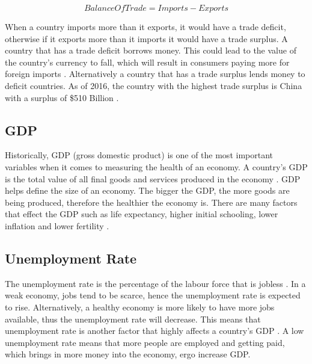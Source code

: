 \documentclass{UoYCSproject}
\begin{document}
\begin{equation}
    Balance Of Trade = Imports - Exports
\end{equation}

When a country imports more than it exports, it would have a trade deficit, otherwise if it exports more than it imports it would have a trade surplus. A country that has a trade deficit borrows money. This could lead to the value of the country's currency to fall, which will result in consumers paying more for foreign imports \cite{2003economics}. Alternatively a country that has a trade surplus lends money to deficit countries. As of 2016, the country with the highest trade surplus is China with a surplus of \$510 Billion \cite{tradesurplus}.   

\subsection{GDP}
Historically, GDP (gross domestic product) is one of the most important variables when it comes to measuring the health of an economy. A country's GDP is the total value of all final goods and services produced in the economy \cite{2003economics}. GDP helps define the size of an economy. The bigger the GDP, the more goods are being produced, therefore the healthier the economy is.  There are many factors that effect the GDP such as life expectancy, higher initial schooling, lower inflation and lower fertility \cite{barro1996determinants}. 

\subsection{Unemployment Rate}

The unemployment rate is the percentage of the labour force that is jobless \cite{unemployment}. In a weak economy, jobs tend to be scarce, hence the unemployment rate is expected to rise. Alternatively, a healthy economy is more likely to have more jobs available, thus the unemployment rate will decrease. This means that unemployment rate is another factor that highly affects a country's GDP \cite{bean1993unemployment}. A low unemployment rate means that more people are employed and getting paid, which brings in more money into the economy, ergo increase GDP.  
\end{document}
